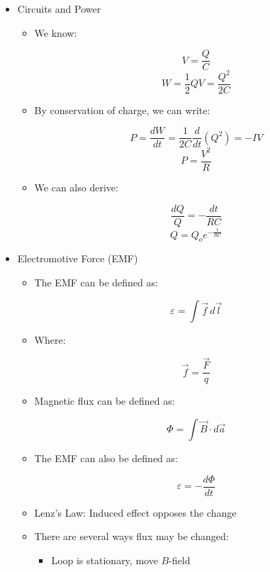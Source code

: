 \begin{itemize}
\begin{itemize}
    \end{itemize}

  \item Circuits and Power

    \begin{itemize}

      \item We know:

        $$V=\frac{Q}{C}$$
        $$W=\frac{1}{2}QV=\frac{Q^2}{2C}$$

      \item By conservation of charge, we can write:

        $$P=\frac{dW}{dt}=\frac{1}{2C}\frac{d}{dt}(Q^2)=-IV$$
        $$P=\frac{V^2}{R}$$

      \item We can also derive:

        $$\frac{dQ}{Q}=-\frac{dt}{RC}$$
        $$Q=Q_oe^{-\frac{t}{RC}}$$

    \end{itemize}

  \item Electromotive Force (EMF)

    \begin{itemize}

      \item The EMF can be defined as:

        $$\varepsilon=\int\vec{f}\,d\vec{l}$$

      \item Where:

        $$\vec{f}=\frac{\vec{F}}{q}$$

      \item Magnetic flux can be defined as:

        $$\Phi=\int\vec{B}\cdot d\vec{a}$$

      \item The EMF can also be defined as:

        $$\varepsilon=-\frac{d\Phi}{dt}$$

      \item Lenz's Law: Induced effect opposes the change

      \item There are several ways flux may be changed:

        \begin{itemize}

          \item Loop is stationary, move $B$-field


\end{itemize}
\end{itemize}
\end{itemize}
